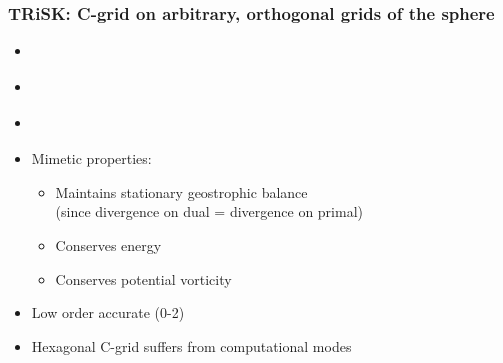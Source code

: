 \begin{frame}
\frametitle{TRiSK: C-grid on arbitrary, orthogonal grids of the sphere}

\begin{itemize}
\item \cite*{Thu08}
\item \cite*{TRSK09}
\item \cite*{RTSK10}


\item Mimetic properties:
    \begin{itemize}
    \item Maintains stationary geostrophic balance\\
        (since divergence on dual = divergence on primal)
    \item Conserves energy
    \item Conserves potential vorticity
    \end{itemize}
\item Low order accurate (0-2)
\item Hexagonal C-grid suffers from computational modes
\end{itemize}
\end{frame}


